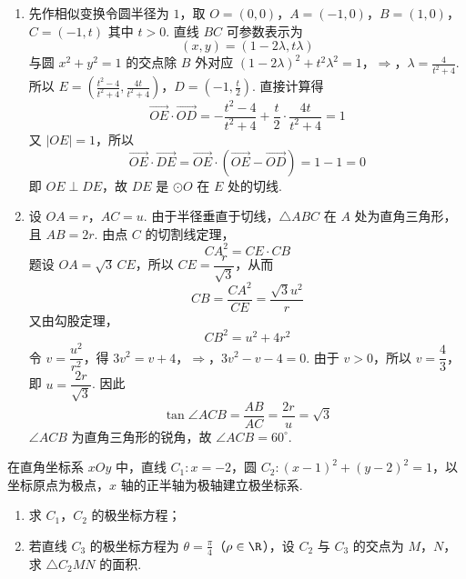 \begin{solution}
\begin{enumerate}
\item 先作相似变换令圆半径为 \(1\)，取
\(O=(0,0)\)，\(A=(-1,0)\)，\(B=(1,0)\)，\(C=(-1,t)\)
其中 \(t>0\). 直线 \(BC\) 可参数表示为
\[
(x,y)=(1-2\lambda,t\lambda)
\]
与圆 \(x^2+y^2=1\) 的交点除 \(B\) 外对应
\((1-2\lambda)^2+t^2\lambda^2=1\)，\(\Longrightarrow\)，\(\lambda=\frac{4}{t^2+4}\).
所以
\(E=\left(\frac{t^2-4}{t^2+4},\frac{4t}{t^2+4}\right)\)，\(D=\left(-1,\frac t2\right)\).
直接计算得
\[
\overrightarrow{OE}\cdot\overrightarrow{OD}
=-\frac{t^2-4}{t^2+4}+\frac t2\cdot\frac{4t}{t^2+4}=1
\]
又 \(|OE|=1\)，所以
\[
\overrightarrow{OE}\cdot\overrightarrow{DE}
=\overrightarrow{OE}\cdot(\overrightarrow{OE}-\overrightarrow{OD})
=1-1=0
\]
即 \(OE\perp DE\)，故 \(DE\) 是 \(\odot O\) 在 \(E\) 处的切线.

\item 设 \(OA=r\)，\(AC=u\). 由于半径垂直于切线，\(\triangle ABC\) 在 \(A\) 处为直角三角形，且 \(AB=2r\). 由点 \(C\) 的切割线定理，
\[
CA^2=CE\cdot CB
\]
题设 \(OA=\sqrt3\,CE\)，所以 \(CE=\dfrac r{\sqrt3}\)，从而
\[
CB=\frac{CA^2}{CE}=\frac{\sqrt3u^2}{r}
\]
又由勾股定理，
\[
CB^2=u^2+4r^2
\]
令 \(v=\dfrac{u^2}{r^2}\)，得
\(3v^2=v+4\)，\(\Longrightarrow\)，\(3v^2-v-4=0\).
由于 \(v>0\)，所以 \(v=\dfrac43\)，即 \(u=\dfrac{2r}{\sqrt3}\). 因此
\[
\tan\angle ACB=\frac{AB}{AC}=\frac{2r}{u}=\sqrt3
\]
\(\angle ACB\) 为直角三角形的锐角，故 \(\angle ACB=60^\circ\).
\end{enumerate}
\end{solution}

\begin{problem}
在直角坐标系 \(xOy\) 中，直线 \(C_1: x = -2\)，圆 \(C_2: (x - 1)^2 + (y - 2)^2 = 1\)，以坐标原点为极点，\(x\) 轴的正半轴为极轴建立极坐标系.

\begin{enumerate}
\item 求 \(C_{1}\)，\(C_{2}\) 的极坐标方程；
\item 若直线 \(C_3\) 的极坐标方程为 \(\theta = \frac{\pi}{4}\)（\(\rho \in \R\)），设 \(C_2\) 与 \(C_3\) 的交点为 \(M\)，\(N\)，求 \(\triangle C_2MN\) 的面积.
\end{enumerate}
\end{problem}

